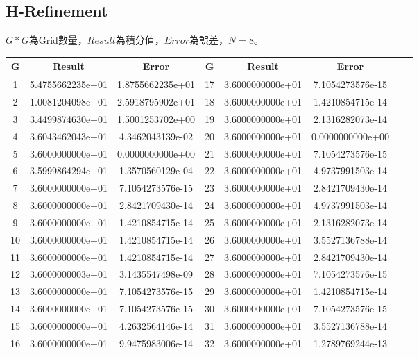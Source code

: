 \documentclass[a4paper,12pt]{article}
\begin{document}
\subsection{H-Refinement}
$G * G$為Grid數量，$Result$為積分值，$Error$為誤差，$N = 8$。
\begin{longtable}{|c|c|c|c|c|c|c|c|}
    \hline
    G & Result & Error & G & Result & Error\\
    \hline
    1 & 5.4755662235e+01 & 1.8755662235e+01 & 17 & 3.6000000000e+01 & 7.1054273576e-15 \\
    \hline
    2 & 1.0081204098e+01 & 2.5918795902e+01 & 18 & 3.6000000000e+01 & 1.4210854715e-14 \\
    \hline
    3 & 3.4499874630e+01 & 1.5001253702e+00 & 19 & 3.6000000000e+01 & 2.1316282073e-14 \\
    \hline
    4 & 3.6043462043e+01 & 4.3462043139e-02 & 20 & 3.6000000000e+01 & 0.0000000000e+00 \\
    \hline
    5 & 3.6000000000e+01 & 0.0000000000e+00 & 21 & 3.6000000000e+01 & 7.1054273576e-15 \\
    \hline
    6 & 3.5999864294e+01 & 1.3570560129e-04 & 22 & 3.6000000000e+01 & 4.9737991503e-14 \\
    \hline
    7 & 3.6000000000e+01 & 7.1054273576e-15 & 23 & 3.6000000000e+01 & 2.8421709430e-14 \\
    \hline
    8 & 3.6000000000e+01 & 2.8421709430e-14 & 24 & 3.6000000000e+01 & 4.9737991503e-14 \\
    \hline
    9 & 3.6000000000e+01 & 1.4210854715e-14 & 25 & 3.6000000000e+01 & 2.1316282073e-14 \\
    \hline
    10 & 3.6000000000e+01 & 1.4210854715e-14 & 26 & 3.6000000000e+01 & 3.5527136788e-14 \\
    \hline
    11 & 3.6000000000e+01 & 1.4210854715e-14 & 27 & 3.6000000000e+01 & 2.8421709430e-14 \\
    \hline
    12 & 3.6000000003e+01 & 3.1435547498e-09 & 28 & 3.6000000000e+01 & 7.1054273576e-15 \\
    \hline
    13 & 3.6000000000e+01 & 7.1054273576e-15 & 29 & 3.6000000000e+01 & 1.4210854715e-14 \\
    \hline
    14 & 3.6000000000e+01 & 7.1054273576e-15 & 30 & 3.6000000000e+01 & 7.1054273576e-15 \\
    \hline
    15 & 3.6000000000e+01 & 4.2632564146e-14 & 31 & 3.6000000000e+01 & 3.5527136788e-14 \\
    \hline
    16 & 3.6000000000e+01 & 9.9475983006e-14 & 32 & 3.6000000000e+01 & 1.2789769244e-13 \\
    \hline
\end{longtable}
\end{document}
